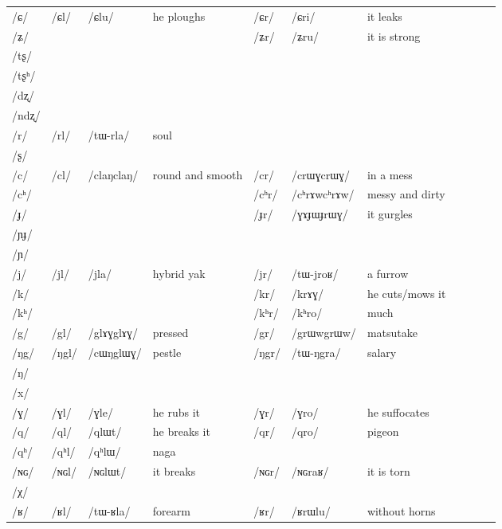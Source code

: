 \documentclass[oldfontcommands,oneside,a4paper,11pt]{article}
\newcommand{\ipa}[1]{/#1/} %
\newcommand{\tib}[1]{\cellcolor{lightgray}\textbf{#1}}
\newcommand{\idph}[1]{\cellcolor{gray}\textbf{#1}}
\begin{document}
\begin{table}
{\begin{tabular}{l|lll|lll|lll|l}
\ipa{ɕ} & 	\ipa{ɕl} & 	\ipa{ɕlu} &he ploughs 	 & 	\ipa{ɕr} & 	\ipa{ɕri} & it leaks	\\
\ipa{ʑ} & 	 & 	  & 	 & 	\ipa{ʑr} & 	\ipa{ʑru} &it is strong 	\\
\ipa{tʂ} & 	 & 	 & 	 & 	 & 	 & 	\\
\ipa{tʂʰ} & 	 & 	 & 	 & 	 & 	 & 	\\
\ipa{dʐ} & 	 & 	 & 	 & 	 & 	 & 	\\
\ipa{ndʐ} & 	 & 	 & 	 & 	 & 	 & 	\\
\ipa{r} & 	\ipa{rl} & 	\ipa{tɯ-rla} &soul 	 & 	 & 	 & 	\\
\ipa{ʂ} & 	 & 	 & 	 & 	 & 	 & 	\\
\ipa{c} & 	\ipa{cl} \idph{}& 	\ipa{claŋclaŋ} & round and smooth	 & 	\ipa{cr} \idph{}& 	\ipa{crɯɣcrɯɣ} & 	in a mess \\
\ipa{cʰ} & 	 & 	 & 	 & 	\ipa{cʰr}\idph{} & 	\ipa{cʰrɤwcʰrɤw} & messy and dirty	\\
\ipa{ɟ} & 	 & 	 & 	 & 	\ipa{ɟr} \idph{}& 	\ipa{ɣɤɟɯɟrɯɣ} & it gurgles	\\
\ipa{ɲɟ} & 	 & 	 & 	 & 	 & 	 & 	\\
\ipa{ɲ} & 	 & 	 & 	 & 	 & 	 & 	\\
\ipa{j} & 	\ipa{jl} & 	\ipa{jla} & 	hybrid yak & 	\ipa{jr} & 	\ipa{tɯ-jroʁ} &a furrow 	\\
\ipa{k} & 	 & 	 & 	 & 	\ipa{kr} & 	\ipa{krɤɣ} & he cuts/mows it	\\
\ipa{kʰ} & 	 & 	 & 	 & 	\ipa{kʰr} & 	\ipa{kʰro} &much 	\\
\ipa{g} & 	\ipa{gl} \idph{}& 	\ipa{glɤɣglɤɣ} & pressed	 & 	\ipa{gr} & 	\ipa{grɯwgrɯw} &matsutake 	\\
\ipa{ŋg} & 	\ipa{ŋgl} & 	\ipa{cɯŋglɯɣ} &pestle 	 & 	\ipa{ŋgr} & 	\ipa{tɯ-ŋgra} &salary 	\\
\ipa{ŋ} & 	 & 	 & 	 & 	 & 	 & 	\\
\ipa{x} & 	 & 	 & 	 & 	 & 	 & 	\\
\ipa{ɣ} & 	\ipa{ɣl} & 	\ipa{ɣle} &he rubs it 	 & 	\ipa{ɣr} & 	\ipa{ɣro} & he suffocates	\\
\ipa{q} & 	\ipa{ql} & 	\ipa{qlɯt} & he breaks it	 & 	\ipa{qr} & 	\ipa{qro} & pigeon	\\
\ipa{qʰ} & 	\ipa{qʰl} \tib{}& 	\ipa{qʰlɯ} &naga 	 & 	 & 	 & 	\\
\ipa{ɴɢ} & 	\ipa{ɴɢl} & 	\ipa{ɴɢlɯt} & 	it breaks & 	\ipa{ɴɢr} & 	\ipa{ɴɢraʁ} &it is torn 	\\
\ipa{χ} & 	 & 	 & 	 & 	 & 	 & 	\\
\ipa{ʁ} & 	\ipa{ʁl} & 	\ipa{tɯ-ʁla} & forearm	 & 	\ipa{ʁr} & 	\ipa{ʁrɯlu} & without horns	\\

\end{tabular}}
\end{table}
\end{document}
